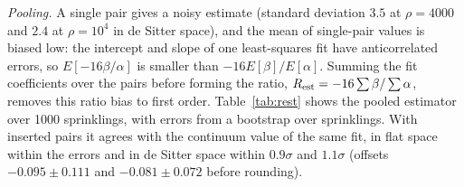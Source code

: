 \documentclass[prd,twocolumn,superscriptaddress,nofootinbib,amsmath,amssymb,floatfix]{revtex4-2}
\begin{document}
\emph{Pooling.} A single pair gives a noisy estimate (standard deviation $3.5$ at $\rho=4000$ and $2.4$ at $\rho=10^4$ in de Sitter space), and the mean of single-pair values is biased low: the intercept and slope of one least-squares fit have anticorrelated errors, so $E[-16\beta/\alpha]$ is smaller than $-16E[\beta]/E[\alpha]$. Summing the fit coefficients over the pairs before forming the ratio, $R_{\rm est}=-16\sum\beta/\sum\alpha$, removes this ratio bias to first order. Table~\ref{tab:rest} shows the pooled estimator over 1000 sprinklings, with errors from a bootstrap over sprinklings. With inserted pairs it agrees with the continuum value of the same fit, in flat space within the errors and in de Sitter space within $0.9\sigma$ and $1.1\sigma$ (offsets $-0.095\pm0.111$ and $-0.081\pm0.072$ before rounding).
\end{document}
